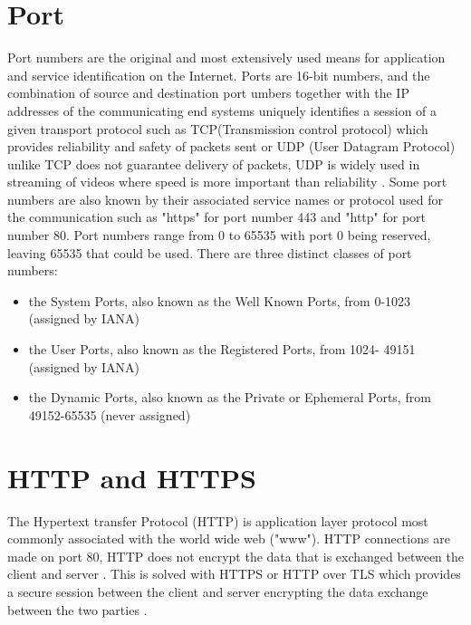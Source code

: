 \documentclass[a4wide,leqno,12pt]{report}
\begin{document}
\section{Port}
Port numbers are the original and most extensively used means for application and service identification on the Internet. Ports are 16-bit numbers, and the combination of source and destination port umbers together with the IP addresses of the communicating end systems uniquely identifies a session of a given transport protocol \cite{cotton2011internet} such as TCP(Transmission control protocol) which provides reliability and safety of packets sent  or UDP (User Datagram Protocol) unlike TCP does not guarantee delivery of packets, UDP is widely used in streaming of videos where speed is more important than reliability \cite{khan2016transport}. Some port numbers are also known by their associated service names or protocol used for the communication such as "https" for port number 443 and "http" for port number 80. Port numbers range from 0 to 65535 with port 0 being reserved, leaving 65535 that could be used. There are three distinct classes of port numbers:

\begin{itemize}
\item the System Ports, also known as the Well Known Ports, from 0-1023
      (assigned by IANA)
\item the User Ports, also known as the Registered Ports, from 1024-
      49151 (assigned by IANA)
\item the Dynamic Ports, also known as the Private or Ephemeral Ports,
      from 49152-65535 (never assigned)
\end{itemize}
\section{HTTP and HTTPS}
The Hypertext transfer Protocol (HTTP) is application layer protocol most commonly associated with the world wide web ("www"). HTTP connections are made on port 80, HTTP does not encrypt the data that is exchanged between the client and server \cite{fielding1999hypertext}. This is solved with HTTPS or HTTP over TLS which provides a secure session between the client and server encrypting the data exchange between the two parties \cite{rescorla2000http}. 
\end{document}
